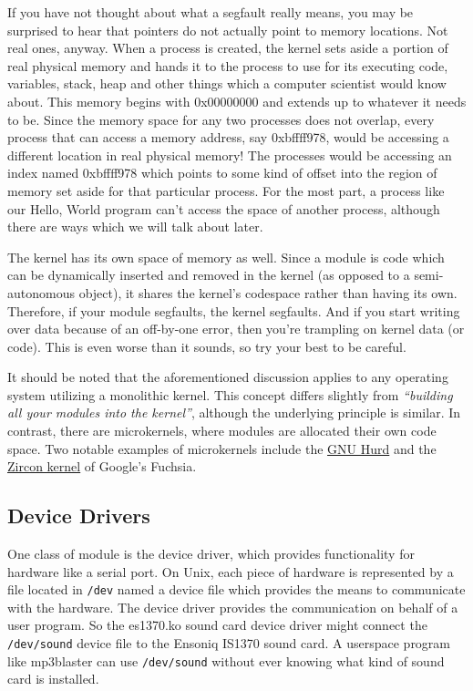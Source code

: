 \documentclass[10pt, oneside]{book}
\begin{document}
If you have not thought about what a segfault really means, you may be surprised to hear that pointers do not actually point to memory locations.
Not real ones, anyway.
When a process is created, the kernel sets aside a portion of real physical memory and hands it to the process to use for its executing code, variables, stack, heap and other things which a computer scientist would know about.
This memory begins with 0x00000000 and extends up to whatever it needs to be.
Since the memory space for any two processes does not overlap, every process that can access a memory address, say 0xbffff978, would be accessing a different location in real physical memory! The processes would be accessing an index named 0xbffff978 which points to some kind of offset into the region of memory set aside for that particular process.
For the most part, a process like our Hello, World program can't access the space of another process, although there are ways which we will talk about later.

The kernel has its own space of memory as well. Since a module is code which can be dynamically inserted and removed in the kernel (as opposed to a semi-autonomous object), it shares the kernel's codespace rather than having its own.
Therefore, if your module segfaults, the kernel segfaults.
And if you start writing over data because of an off-by-one error, then you're trampling on kernel data (or code).
This is even worse than it sounds, so try your best to be careful.

It should be noted that the aforementioned discussion applies to any operating system utilizing a monolithic kernel.
This concept differs slightly from \emph{``building all your modules into the kernel''},
although the underlying principle is similar.
In contrast, there are microkernels, where modules are allocated their own code space.
Two notable examples of microkernels include the \href{https://www.gnu.org/software/hurd/}{GNU Hurd} and the \href{https://fuchsia.dev/fuchsia-src/concepts/kernel}{Zircon kernel} of Google's Fuchsia.

\subsection{Device Drivers}
\label{sec:device_drivers}
One class of module is the device driver, which provides functionality for hardware like a serial port.
On Unix, each piece of hardware is represented by a file located in \verb|/dev| named a device file which provides the means to communicate with the hardware.
The device driver provides the communication on behalf of a user program.
So the es1370.ko sound card device driver might connect the \verb|/dev/sound| device file to the Ensoniq IS1370 sound card.
A userspace program like mp3blaster can use \verb|/dev/sound| without ever knowing what kind of sound card is installed.
\end{document}
